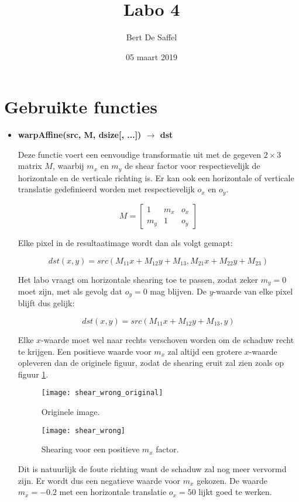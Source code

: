 \documentclass{article}
\begin{document}
	\title{Labo 4}
	\author{Bert De Saffel}
	\date{05 maart 2019}
	\maketitle
	
	\section{Gebruikte functies}
	\begin{itemize}
		 \item \textbf{warpAffine(src, M, dsize[, ...]) $\rightarrow$ dst}
		 
		 Deze functie voert een eenvoudige transformatie uit met de gegeven $2\times 3$ matrix $M$, waarbij $m_x$ en $m_y$ de shear factor voor respectievelijk de horizontale en de verticale richting is. Er kan ook een horizontale of verticale translatie gedefinieerd worden met respectievelijk $o_x$ en $o_y$.
		 
		 $$M = \begin{bmatrix}
		 1 & m_x & o_x \\
		 m_y & 1 & o_y
		 \end{bmatrix}$$
		 
		 Elke pixel in de resultaatimage wordt dan als volgt gemapt:
		 
		 $$dst(x, y) = src(M_{11}x + M_{12}y + M_{13}, M_{21}x + M_{22}y + M_{23})$$
		 
		 Het labo vraagt om horizontale shearing toe te passen, zodat zeker $m_y = 0$ moet zijn, met als gevolg dat $o_y = 0$ mag blijven. De $y$-waarde van elke pixel blijft dus gelijk:
		 
		 $$dst(x, y) = src(M_{11}x + M_{12}y + M_{13}, y) $$
		 
		 Elke $x$-waarde moet wel naar rechts verschoven worden om de schaduw recht te krijgen. Een positieve waarde voor $m_x$ zal altijd een grotere $x$-waarde opleveren dan de originele figuur, zodat de shearing eruit zal zien zoals op figuur \ref{fig:shear_wrong}.
		\begin{figure}[!htb]
		 	\begin{minipage}{0.48\textwidth}
		 	\centering
			\texttt{[image: shear\_wrong\_original]}
			\caption{Originele image.}
			\label{fig:shear_wrong_original}
		 	\end{minipage}\hfill
		 	\begin{minipage}{0.48\textwidth}
		 	\centering
			\texttt{[image: shear\_wrong]}
			\caption{Shearing voor een positieve $m_x$ factor.}
			\label{fig:shear_wrong}
		 	\end{minipage}
		 \end{figure}
		 Dit is natuurlijk de foute richting want de schaduw zal nog meer vervormd zijn. Er wordt dus een negatieve waarde voor $m_x$ gekozen. De waarde $m_x = -0.2$ met een horizontale translatie $o_x = 50$ lijkt goed te werken.
		 

\end{itemize}
\end{document}

